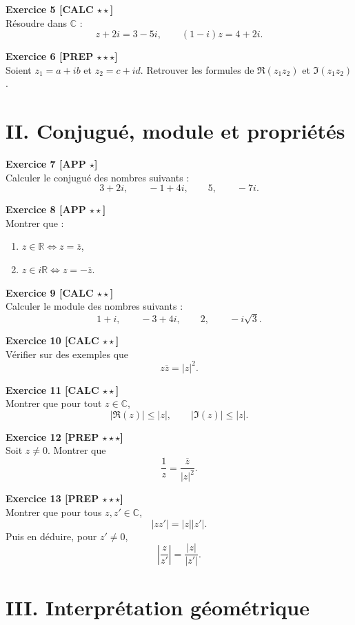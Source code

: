 \documentclass[11pt,a4paper]{article}
\newcommand{\R}{\mathbb{R}}
\newcommand{\C}{\mathbb{C}}
\begin{document}
\textbf{Exercice 5 [CALC $\star\star$]}\\
Résoudre dans \(\C\) :
\[
z+2i=3-5i,
\qquad
(1-i)z=4+2i.
\]

\textbf{Exercice 6 [PREP $\star\star\star$]}\\
Soient \(z_1=a+ib\) et \(z_2=c+id\).  
Retrouver les formules de \(\Re(z_1z_2)\) et \(\Im(z_1z_2)\).

\section*{II. Conjugué, module et propriétés}

\textbf{Exercice 7 [APP $\star$]}\\
Calculer le conjugué des nombres suivants :
\[
3+2i,\qquad -1+4i,\qquad 5,\qquad -7i.
\]

\textbf{Exercice 8 [APP $\star\star$]}\\
Montrer que :
\begin{enumerate}[label=\alph*)]
    \item \(z\in \R \Longleftrightarrow z=\overline z\),
    \item \(z\in i\R \Longleftrightarrow z=-\overline z\).
\end{enumerate}

\textbf{Exercice 9 [CALC $\star\star$]}\\
Calculer le module des nombres suivants :
\[
1+i,\qquad -3+4i,\qquad 2,\qquad -i\sqrt{3}.
\]

\textbf{Exercice 10 [CALC $\star\star$]}\\
Vérifier sur des exemples que
\[
z\overline z=|z|^2.
\]

\textbf{Exercice 11 [CALC $\star\star$]}\\
Montrer que pour tout \(z\in\C\),
\[
|\Re(z)|\le |z|,\qquad |\Im(z)|\le |z|.
\]

\textbf{Exercice 12 [PREP $\star\star\star$]}\\
Soit \(z\neq 0\). Montrer que
\[
\frac{1}{z}=\frac{\overline z}{|z|^2}.
\]

\textbf{Exercice 13 [PREP $\star\star\star$]}\\
Montrer que pour tous \(z,z'\in\C\),
\[
|zz'|=|z||z'|.
\]
Puis en déduire, pour \(z'\neq 0\),
\[
\left|\frac{z}{z'}\right|=\frac{|z|}{|z'|}.
\]

\section*{III. Interprétation géométrique}
\end{document}
